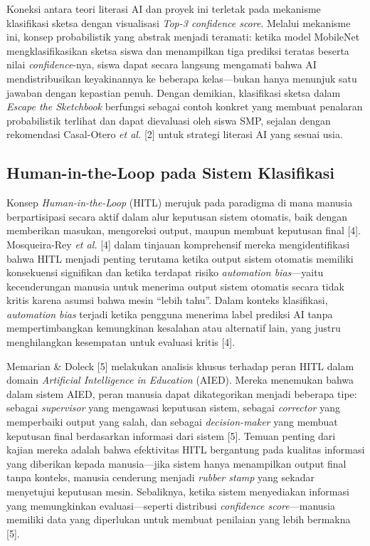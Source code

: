 \documentclass[10pt,twoside,openright]{report}
\begin{document}
Koneksi antara teori literasi AI dan proyek ini terletak pada mekanisme klasifikasi sketsa dengan visualisasi \textit{Top-3 confidence score}. Melalui mekanisme ini, konsep probabilistik yang abstrak menjadi teramati: ketika model MobileNet mengklasifikasikan sketsa siswa dan menampilkan tiga prediksi teratas beserta nilai \textit{confidence}-nya, siswa dapat secara langsung mengamati bahwa AI mendistribusikan keyakinannya ke beberapa kelas—bukan hanya menunjuk satu jawaban dengan kepastian penuh. Dengan demikian, klasifikasi sketsa dalam \textit{Escape the Sketchbook} berfungsi sebagai contoh konkret yang membuat penalaran probabilistik terlihat dan dapat dievaluasi oleh siswa SMP, sejalan dengan rekomendasi Casal-Otero \textit{et al.} [2] untuk strategi literasi AI yang sesuai usia.

\subsection{Human-in-the-Loop pada Sistem Klasifikasi}
\label{subsec:hitl-klasifikasi}

Konsep \textit{Human-in-the-Loop} (HITL) merujuk pada paradigma di mana manusia berpartisipasi secara aktif dalam alur keputusan sistem otomatis, baik dengan memberikan masukan, mengoreksi output, maupun membuat keputusan final [4]. Mosqueira-Rey \textit{et al.} [4] dalam tinjauan komprehensif mereka mengidentifikasi bahwa HITL menjadi penting terutama ketika output sistem otomatis memiliki konsekuensi signifikan dan ketika terdapat risiko \textit{automation bias}—yaitu kecenderungan manusia untuk menerima output sistem otomatis secara tidak kritis karena asumsi bahwa mesin ``lebih tahu''. Dalam konteks klasifikasi, \textit{automation bias} terjadi ketika pengguna menerima label prediksi AI tanpa mempertimbangkan kemungkinan kesalahan atau alternatif lain, yang justru menghilangkan kesempatan untuk evaluasi kritis [4].

Memarian \& Doleck [5] melakukan analisis khusus terhadap peran HITL dalam domain \textit{Artificial Intelligence in Education} (AIED). Mereka menemukan bahwa dalam sistem AIED, peran manusia dapat dikategorikan menjadi beberapa tipe: sebagai \textit{supervisor} yang mengawasi keputusan sistem, sebagai \textit{corrector} yang memperbaiki output yang salah, dan sebagai \textit{decision-maker} yang membuat keputusan final berdasarkan informasi dari sistem [5]. Temuan penting dari kajian mereka adalah bahwa efektivitas HITL bergantung pada kualitas informasi yang diberikan kepada manusia—jika sistem hanya menampilkan output final tanpa konteks, manusia cenderung menjadi \textit{rubber stamp} yang sekadar menyetujui keputusan mesin. Sebaliknya, ketika sistem menyediakan informasi yang memungkinkan evaluasi—seperti distribusi \textit{confidence score}—manusia memiliki data yang diperlukan untuk membuat penilaian yang lebih bermakna [5].
\end{document}
